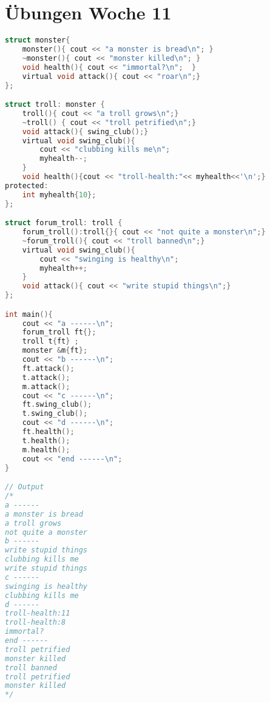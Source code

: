 
\section{Übungen Woche 11}

\begin{lstlisting}[style=frame, style= linenumbers, language=C]
struct monster{
	monster(){ cout << "a monster is bread\n"; }
	~monster(){ cout << "monster killed\n"; }
	void health(){ cout << "immortal?\n";  }
	virtual void attack(){ cout << "roar\n";}
};

struct troll: monster {
	troll(){ cout << "a troll grows\n";}
	~troll() { cout << "troll petrified\n";}
	void attack(){ swing_club();}
	virtual void swing_club(){
		cout << "clubbing kills me\n";
		myhealth--;
	}
	void health(){cout << "troll-health:"<< myhealth<<'\n';}
protected:
	int myhealth{10};
};

struct forum_troll: troll {
	forum_troll():troll{}{ cout << "not quite a monster\n";}
	~forum_troll(){ cout << "troll banned\n";}
	virtual void swing_club(){
		cout << "swinging is healthy\n";
		myhealth++;
	}
	void attack(){ cout << "write stupid things\n";}
};

int main(){
	cout << "a ------\n";
	forum_troll ft{};
	troll t{ft} ;
	monster &m{ft};
	cout << "b ------\n";
	ft.attack();
	t.attack();
	m.attack();
	cout << "c ------\n";
	ft.swing_club();
	t.swing_club();
	cout << "d ------\n";
	ft.health();
	t.health();
	m.health();
	cout << "end ------\n";
}

// Output
/*
a ------
a monster is bread
a troll grows
not quite a monster
b ------
write stupid things
clubbing kills me
write stupid things
c ------
swinging is healthy
clubbing kills me
d ------
troll-health:11
troll-health:8
immortal?
end ------
troll petrified
monster killed
troll banned
troll petrified
monster killed
*/

\end{lstlisting}